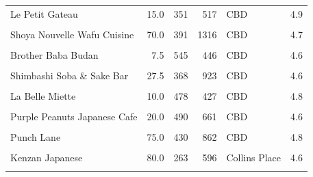 \documentclass[11pt,a4paper,]{article}
\begin{document}
\begin{table}[!h]
\begin{tabular}[t]{l|r|r|r|l|l}
\hline
\cellcolor{gray!6}{Sakura Kaiten Sushi} & \cellcolor{gray!6}{30.0} & \cellcolor{gray!6}{437} & \cellcolor{gray!6}{1111} & \cellcolor{gray!6}{CBD} & \cellcolor{gray!6}{4.6}\\
\hline
Le Petit Gateau & 15.0 & 351 & 517 & CBD & 4.9\\
\hline
\cellcolor{gray!6}{Vue de monde} & \cellcolor{gray!6}{300.0} & \cellcolor{gray!6}{985} & \cellcolor{gray!6}{2755} & \cellcolor{gray!6}{CBD} & \cellcolor{gray!6}{4.9}\\
\hline
Shoya Nouvelle Wafu Cuisine & 70.0 & 391 & 1316 & CBD & 4.7\\
\hline
\cellcolor{gray!6}{Wonderbao} & \cellcolor{gray!6}{10.0} & \cellcolor{gray!6}{773} & \cellcolor{gray!6}{773} & \cellcolor{gray!6}{CBD} & \cellcolor{gray!6}{4.6}\\
\hline
Brother Baba Budan & 7.5 & 545 & 446 & CBD & 4.6\\
\hline
\cellcolor{gray!6}{Patricia Coffee Brewers} & \cellcolor{gray!6}{7.5} & \cellcolor{gray!6}{364} & \cellcolor{gray!6}{292} & \cellcolor{gray!6}{CBD} & \cellcolor{gray!6}{4.9}\\
\hline
Shimbashi Soba \& Sake Bar & 27.5 & 368 & 923 & CBD & 4.6\\
\hline
\cellcolor{gray!6}{Maha Restaurant} & \cellcolor{gray!6}{150.0} & \cellcolor{gray!6}{931} & \cellcolor{gray!6}{1240} & \cellcolor{gray!6}{CBD} & \cellcolor{gray!6}{4.7}\\
\hline
La Belle Miette & 10.0 & 478 & 427 & CBD & 4.8\\
\hline
\cellcolor{gray!6}{Little Rogue} & \cellcolor{gray!6}{10.0} & \cellcolor{gray!6}{334} & \cellcolor{gray!6}{671} & \cellcolor{gray!6}{CBD} & \cellcolor{gray!6}{4.7}\\
\hline
Purple Peanuts Japanese Cafe & 20.0 & 490 & 661 & CBD & 4.6\\
\hline
\cellcolor{gray!6}{Coda} & \cellcolor{gray!6}{72.5} & \cellcolor{gray!6}{562} & \cellcolor{gray!6}{704} & \cellcolor{gray!6}{CBD} & \cellcolor{gray!6}{4.6}\\
\hline
Punch Lane & 75.0 & 430 & 862 & CBD & 4.8\\
\hline
\cellcolor{gray!6}{Aka Siro} & \cellcolor{gray!6}{40.0} & \cellcolor{gray!6}{238} & \cellcolor{gray!6}{491} & \cellcolor{gray!6}{Collingwood} & \cellcolor{gray!6}{4.8}\\
\hline
Kenzan Japanese & 80.0 & 263 & 596 & Collins Place & 4.6\\
\hline
\cellcolor{gray!6}{Addict Food \& Coffee} & \cellcolor{gray!6}{20.0} & \cellcolor{gray!6}{570} & \cellcolor{gray!6}{1350} & \cellcolor{gray!6}{Fitzroy} & \cellcolor{gray!6}{4.6}\\

\end{tabular}
\end{table}
\end{document}

